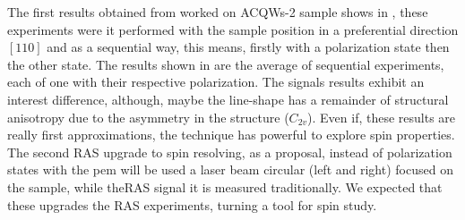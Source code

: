 The first results obtained from worked on \gls{ACQWs}-2 sample shows in , these experiments were it performed with the sample position in a preferential direction $[110]$
and as a sequential way, this means, firstly with a polarization state then the other state.
The results shown in  are the average of sequential experiments, each of one with
their respective polarization. The signals results exhibit an interest difference, although,
maybe the line-shape has a remainder of structural anisotropy due to the asymmetry in
the structure ($C_{2v}$).  Even if, these results are really first approximations, the technique has powerful to explore spin properties. The second RAS upgrade to spin resolving, as a proposal, instead of polarization states with the \gls{pem} will be used a laser beam circular (left and right) focused on the sample, while the\gls{RAS} signal it is measured traditionally. We expected that these upgrades the RAS experiments, turning a tool for spin study. 





